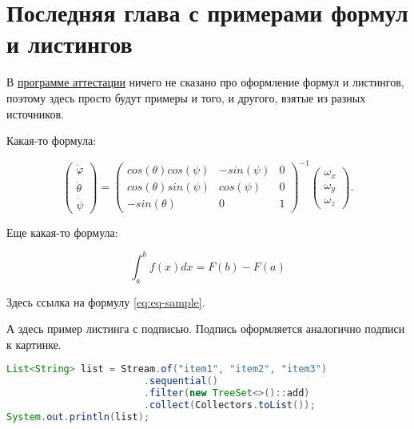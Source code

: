 \chapter{Последняя глава с примерами формул и листингов}

В \href{http://fit.nsu.ru/data_/docs/bak/OOP/4_RPD/09.03.01/_09.03.01_GIA.pdf}{программе аттестации} ничего не сказано про оформление формул и листингов, поэтому здесь просто будут примеры и того, и другого, взятые из разных источников.

Какая-то формула:

\begin{equation}
\begin{pmatrix} 
	\dot{\varphi}\\ \dot{\theta} \\ \dot{\psi} 
\end{pmatrix} =
\begin{pmatrix}
	cos(\theta)cos(\psi) & -sin(\psi) & 0 \\
	cos(\theta)sin(\psi) & cos(\psi)  & 0 \\
	-sin(\theta)         & 0         &  1
\end{pmatrix}^{-1}
\begin{pmatrix}
	\omega_x\\ \omega_y \\ \omega_z
\end{pmatrix}.
\end{equation}

Еще какая-то формула:

\begin{equation}
\int_{a}^{b} f(x)dx = F(b) - F(a)
\label{eq:eq-sample}
\end{equation}

Здесь ссылка на формулу \ref{eq:eq-sample}.

А здесь пример листинга с подписью. Подпись оформляется аналогично подписи к картинке.

\begin{lstlisting}[language=Java,caption=Пример листинга]
List<String> list = Stream.of("item1", "item2", "item3")
						.sequential()
						.filter(new TreeSet<>()::add)
						.collect(Collectors.toList());
System.out.println(list);
\end{lstlisting}